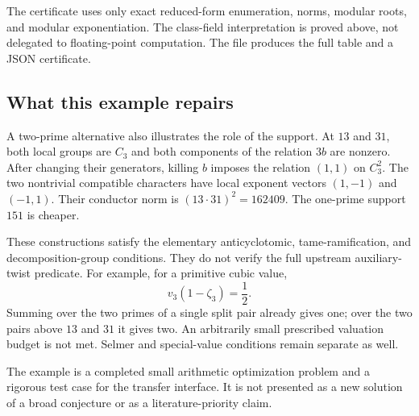 The certificate uses only exact reduced-form enumeration, norms, modular roots, and modular exponentiation. The class-field interpretation is proved above, not delegated to floating-point computation. The file  produces the full table and a JSON certificate.

\subsection{What this example repairs}

A two-prime alternative also illustrates the role of the support. At $13$ and $31$, both local groups are $C_3$ and both components of the relation $3b$ are nonzero. After changing their generators, killing $b$ imposes the relation $(1,1)$ on $C_3^2$. The two nontrivial compatible characters have local exponent vectors $(1,-1)$ and $(-1,1)$. Their conductor norm is $(13\cdot31)^2=162409$. The one-prime support $151$ is cheaper.

These constructions satisfy the elementary anticyclotomic, tame-ramification, and decomposition-group conditions. They do not verify the full upstream auxiliary-twist predicate. For example, for a primitive cubic value,
\[
                    v_3(1-\zeta_3)=\frac12.
\]
Summing over the two primes of a single split pair already gives one; over the two pairs above $13$ and $31$ it gives two. An arbitrarily small prescribed valuation budget is not met. Selmer and special-value conditions remain separate as well.

The example is a completed small arithmetic optimization problem and a rigorous test case for the transfer interface. It is not presented as a new solution of a broad conjecture or as a literature-priority claim.

